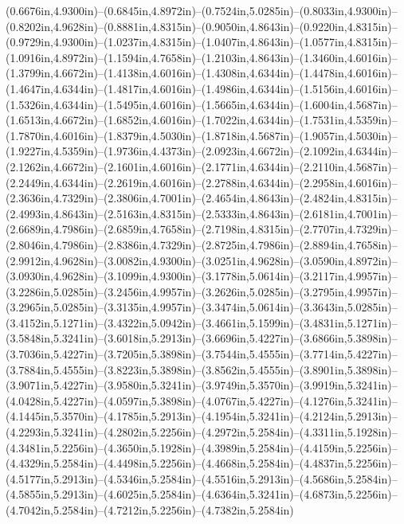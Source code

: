 (0.6676in,4.9300in)--(0.6845in,4.8972in)--(0.7524in,5.0285in)--(0.8033in,4.9300in)--(0.8202in,4.9628in)--(0.8881in,4.8315in)--(0.9050in,4.8643in)--(0.9220in,4.8315in)--(0.9729in,4.9300in)--(1.0237in,4.8315in)--(1.0407in,4.8643in)--(1.0577in,4.8315in)--(1.0916in,4.8972in)--(1.1594in,4.7658in)--(1.2103in,4.8643in)--(1.3460in,4.6016in)--(1.3799in,4.6672in)--(1.4138in,4.6016in)--(1.4308in,4.6344in)--(1.4478in,4.6016in)--(1.4647in,4.6344in)--(1.4817in,4.6016in)--(1.4986in,4.6344in)--(1.5156in,4.6016in)--(1.5326in,4.6344in)--(1.5495in,4.6016in)--(1.5665in,4.6344in)--(1.6004in,4.5687in)--(1.6513in,4.6672in)--(1.6852in,4.6016in)--(1.7022in,4.6344in)--(1.7531in,4.5359in)--(1.7870in,4.6016in)--(1.8379in,4.5030in)--(1.8718in,4.5687in)--(1.9057in,4.5030in)--(1.9227in,4.5359in)--(1.9736in,4.4373in)--(2.0923in,4.6672in)--(2.1092in,4.6344in)--(2.1262in,4.6672in)--(2.1601in,4.6016in)--(2.1771in,4.6344in)--(2.2110in,4.5687in)--(2.2449in,4.6344in)--(2.2619in,4.6016in)--(2.2788in,4.6344in)--(2.2958in,4.6016in)--(2.3636in,4.7329in)--(2.3806in,4.7001in)--(2.4654in,4.8643in)--(2.4824in,4.8315in)--(2.4993in,4.8643in)--(2.5163in,4.8315in)--(2.5333in,4.8643in)--(2.6181in,4.7001in)--(2.6689in,4.7986in)--(2.6859in,4.7658in)--(2.7198in,4.8315in)--(2.7707in,4.7329in)--(2.8046in,4.7986in)--(2.8386in,4.7329in)--(2.8725in,4.7986in)--(2.8894in,4.7658in)--(2.9912in,4.9628in)--(3.0082in,4.9300in)--(3.0251in,4.9628in)--(3.0590in,4.8972in)--(3.0930in,4.9628in)--(3.1099in,4.9300in)--(3.1778in,5.0614in)--(3.2117in,4.9957in)--(3.2286in,5.0285in)--(3.2456in,4.9957in)--(3.2626in,5.0285in)--(3.2795in,4.9957in)--(3.2965in,5.0285in)--(3.3135in,4.9957in)--(3.3474in,5.0614in)--(3.3643in,5.0285in)--(3.4152in,5.1271in)--(3.4322in,5.0942in)--(3.4661in,5.1599in)--(3.4831in,5.1271in)--(3.5848in,5.3241in)--(3.6018in,5.2913in)--(3.6696in,5.4227in)--(3.6866in,5.3898in)--(3.7036in,5.4227in)--(3.7205in,5.3898in)--(3.7544in,5.4555in)--(3.7714in,5.4227in)--(3.7884in,5.4555in)--(3.8223in,5.3898in)--(3.8562in,5.4555in)--(3.8901in,5.3898in)--(3.9071in,5.4227in)--(3.9580in,5.3241in)--(3.9749in,5.3570in)--(3.9919in,5.3241in)--(4.0428in,5.4227in)--(4.0597in,5.3898in)--(4.0767in,5.4227in)--(4.1276in,5.3241in)--(4.1445in,5.3570in)--(4.1785in,5.2913in)--(4.1954in,5.3241in)--(4.2124in,5.2913in)--(4.2293in,5.3241in)--(4.2802in,5.2256in)--(4.2972in,5.2584in)--(4.3311in,5.1928in)--(4.3481in,5.2256in)--(4.3650in,5.1928in)--(4.3989in,5.2584in)--(4.4159in,5.2256in)--(4.4329in,5.2584in)--(4.4498in,5.2256in)--(4.4668in,5.2584in)--(4.4837in,5.2256in)--(4.5177in,5.2913in)--(4.5346in,5.2584in)--(4.5516in,5.2913in)--(4.5686in,5.2584in)--(4.5855in,5.2913in)--(4.6025in,5.2584in)--(4.6364in,5.3241in)--(4.6873in,5.2256in)--(4.7042in,5.2584in)--(4.7212in,5.2256in)--(4.7382in,5.2584in)
